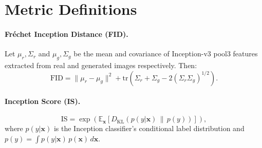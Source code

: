 \documentclass[12pt, a4paper]{article}
\begin{document}
\section{Metric Definitions}
\label{app:metrics}

\paragraph{Fréchet Inception Distance (FID).}
Let $\mu_r, \Sigma_r$ and $\mu_g, \Sigma_g$ be the mean and covariance
of Inception-v3 pool3 features extracted from real and generated
images respectively. Then:
\[
    \mathrm{FID} = \|\mu_r - \mu_g\|^2
                 + \mathrm{tr}\!\left(
                     \Sigma_r + \Sigma_g
                     - 2\!\left(\Sigma_r \Sigma_g\right)^{1/2}
                   \right).
\]

\paragraph{Inception Score (IS).}
\[
    \mathrm{IS} = \exp\!\left(
        \mathbb{E}_{\mathbf{x}}\left[
            D_{\mathrm{KL}}\!\left(
                p(y|\mathbf{x}) \,\|\, p(y)
            \right)
        \right]
    \right),
\]
where $p(y|\mathbf{x})$ is the Inception classifier's conditional
label distribution and $p(y) = \int p(y|\mathbf{x})\,p(\mathbf{x})\,d\mathbf{x}$.
\end{document}

